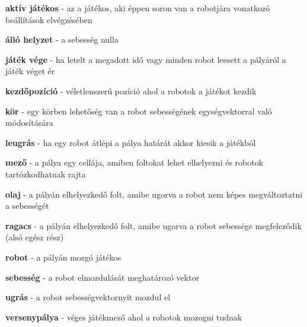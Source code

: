 \textbf{aktív játékos} - az a játékos, aki éppen soron van a robotjára vonatkozó beállítások elvégzésében

\textbf{álló helyzet} - a sebesség nulla

\textbf{játék vége} - ha letelt a megadott idő vagy minden robot leesett a pályáról a játék véget ér

\textbf{kezdőpozíció} - véletlenszerű pozíció ahol a robotok a játékot kezdik

\textbf{kör} - egy körben lehetőség van a robot sebességének egységvektorral való módosítására

\textbf{leugrás} - ha egy robot átlépi a pálya határát akkor kiesik a játékból

\textbf{mező} - a pálya egy cellája, amiben foltokat lehet elhelyezni és robotok tartózkodhatnak rajta

\textbf{olaj} - a pályán elhelyezkedő folt, amibe ugorva a robot nem képes megváltoztatni a sebességét

\textbf{ragacs} - a pályán elhelyezkedő folt, amibe ugorva a robot sebessége megfeleződik (alsó egész rész)

\textbf{robot} - a pályán mozgó játékos

\textbf{sebesség} - a robot elmozdulását meghatározó vektor

\textbf{ugrás} - a robot sebességvektornyit mozdul el

\textbf{versenypálya} - véges játékmező ahol a robotok mozogni tudnak
